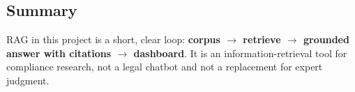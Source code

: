 \subsection{Summary}
\label{sec:rag-summary}

RAG in this project is a short, clear loop: \textbf{corpus $\rightarrow$ retrieve
$\rightarrow$ grounded answer with citations $\rightarrow$ dashboard}. It is an
information-retrieval tool for compliance research, not a legal chatbot and not a
replacement for expert judgment.
